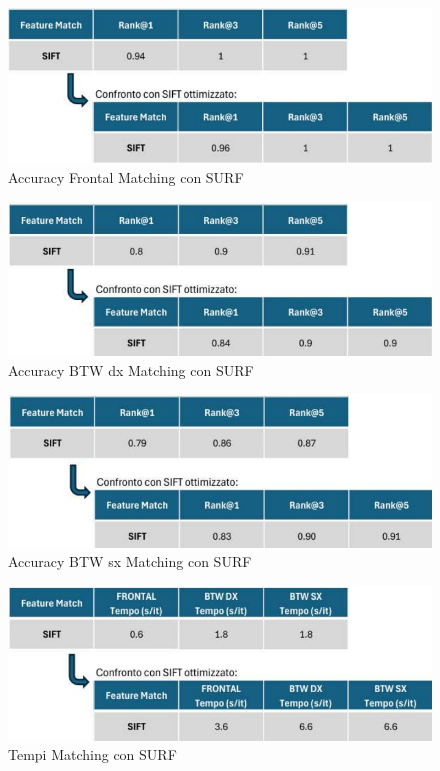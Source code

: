 \documentclass[12pt,a4paper,openright,twoside]{book}
\begin{document}
\begin{figure}[H]
	\centering	\includegraphics{figures/frontal8_1.pdf}
    	\caption{Accuracy Frontal Matching con SURF}
	\label{fig:frontalSURF}
\end{figure}
\begin{figure}[H]
	\centering
	\includegraphics{figures/dx8_1.pdf}
    	\caption{Accuracy BTW dx Matching con SURF}
	\label{fig:dxSURF}
\end{figure}
\begin{figure}[H]
	\centering
	\includegraphics{figures/sx13_1.pdf}
    	\caption{Accuracy BTW sx Matching con SURF}
	\label{fig:sxSURF}
\end{figure}
\begin{figure}[H]
	\centering	\includegraphics{figures/tempi8_1.pdf}
    	\caption{Tempi Matching con SURF}
	\label{fig:tempiSURF}
\end{figure}
\end{document}
